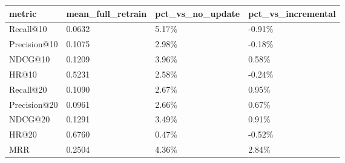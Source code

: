 \begin{tabular}{llll}
\toprule
metric & mean_full_retrain & pct_vs_no_update & pct_vs_incremental \\
\midrule
Recall@10 & 0.0632 & 5.17\% & -0.91\% \\
Precision@10 & 0.1075 & 2.98\% & -0.18\% \\
NDCG@10 & 0.1209 & 3.96\% & 0.58\% \\
HR@10 & 0.5231 & 2.58\% & -0.24\% \\
Recall@20 & 0.1090 & 2.67\% & 0.95\% \\
Precision@20 & 0.0961 & 2.66\% & 0.67\% \\
NDCG@20 & 0.1291 & 3.49\% & 0.91\% \\
HR@20 & 0.6760 & 0.47\% & -0.52\% \\
MRR & 0.2504 & 4.36\% & 2.84\% \\
\bottomrule
\end{tabular}
